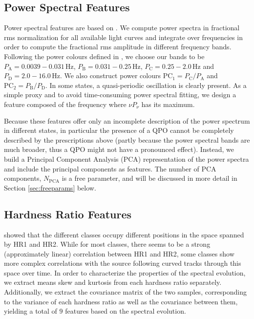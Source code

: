 \documentclass[12pt]{emulateapj}
\begin{document}


\subsection{Power Spectral Features}

Power spectral features are based on \citep{heil2015}. We compute power spectra in fractional rms normalization for all available light curves and integrate over frequencies in order to compute the fractional rms amplitude in different frequency bands. 
Following the power colours defined in \citet{heil2015}, we choose our bands to be $P_\mathrm{A} = 0.0039-0.031 \,\mathrm{Hz}$, 
$P_\mathrm{B} = 0.031-0.25 \,\mathrm{Hz}$, $P_\mathrm{C} =  0.25-2.0 \,\mathrm{Hz}$ and $P_\mathrm{D} = 2.0-16.0 \,\mathrm{Hz}$. We also construct power colours $\mathrm{PC}_1 = P_\mathrm{C}/P_\mathrm{A}$ and  $\mathrm{PC}_2 = P_\mathrm{B}/P_\mathrm{D}$.
In some states, a quasi-periodic oscillation is clearly present. As a simple proxy and to avoid time-consuming power spectral fitting, we design a feature composed of the frequency where $\nu P_\nu$ has its maximum. 

Because these features offer only an incomplete description of the power spectrum in different states, in particular the presence of a QPO cannot be completely described by the prescriptions above (partly because the power spectral bands are much broader, thus a QPO might not have a pronounced effect). Instead, we build a Principal Component Analysis (PCA) representation of the power spectra and include the principal components as features. The number of PCA components, $N_\mathrm{PCA}$ is a free parameter, and will be discussed in more detail in Section \ref{sec:freeparams} below. 

\subsection{Hardness Ratio Features}

\citet{belloni2000} showed that the different classes occupy different positions in the space spanned by HR1 and HR2. While for most classes, there seems to be a strong (approximately linear) correlation between HR1 and HR2, some classes show more complex correlations with the source following curved tracks through this space over time. In order to characterize the properties of the spectral evolution, we extract means skew and kurtosis from each hardness ratio separately. Additionally, we extract the covariance matrix of the two samples, corresponding to the variance of each hardness ratio as well as the covariance between them, yielding a total of $9$ features based on the spectral evolution.
\end{document}
